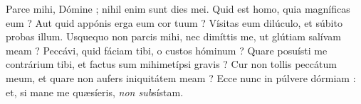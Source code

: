 \lettrine{P}{}arce mihi, Dómine ; nihil enim sunt dies mei.
Quid est homo, quia magníficas eum ? Aut quid appónis erga eum cor tuum ?
Vísitas eum dilúculo, et súbito probas illum.
Usquequo non parcis mihi, nec dimíttis me, ut glútiam salívam meam ?
Peccávi, quid fáciam tibi, o custos hóminum ? Quare posuísti me contrárium tibi, et factus sum mihimetípsi gravis ?
Cur non tollis peccátum meum, et quare non aufers iniquitátem meam ? Ecce nunc in púlvere dórmiam : et, si mane me quæsíeris, \textit{non sub}sístam.\\

